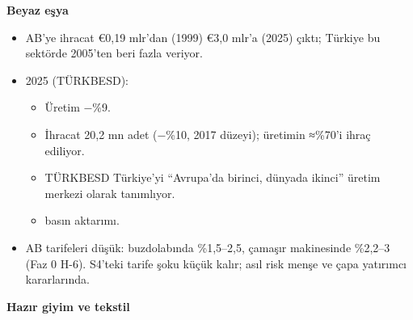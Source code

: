 \textbf{Beyaz eşya}

\begin{itemize}
\tightlist
\item
  AB'ye ihracat €0,19 mlr'dan (1999) €3,0 mlr'a (2025) çıktı; Türkiye bu sektörde 2005'ten beri fazla veriyor. \etiketV{}
\item
  2025 (TÜRKBESD):

  \begin{itemize}
  \tightlist
  \item
    Üretim −\%9.
  \item
    İhracat 20,2 mn adet (−\%10, 2017 düzeyi); üretimin ≈\%70'i ihraç ediliyor.
  \item
    TÜRKBESD Türkiye'yi ``Avrupa'da birinci, dünyada ikinci'' üretim merkezi olarak tanımlıyor.
  \item
    \etiketV{} basın aktarımı.
  \end{itemize}
\item
  AB tarifeleri düşük: buzdolabında \%1,5--2,5, çamaşır makinesinde \%2,2--3 (Faz 0 H-6). S4'teki tarife şoku küçük kalır; asıl risk menşe ve çapa yatırımcı kararlarında.
\end{itemize}

\textbf{Hazır giyim ve tekstil}

